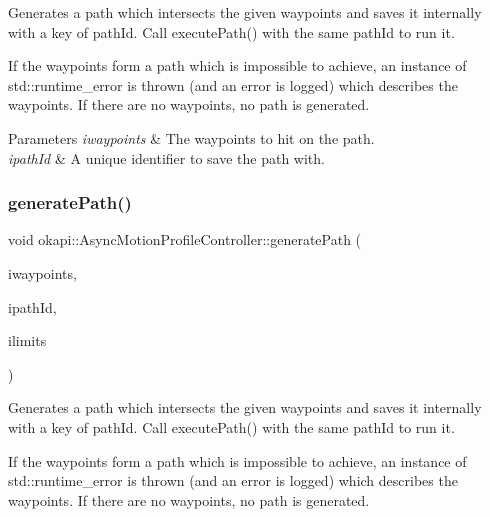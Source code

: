 Generates a path which intersects the given waypoints and saves it internally with a key of path\+Id. Call {\ttfamily execute\+Path()} with the same path\+Id to run it.

If the waypoints form a path which is impossible to achieve, an instance of {\ttfamily std\+::runtime\+\_\+error} is thrown (and an error is logged) which describes the waypoints. If there are no waypoints, no path is generated.


\begin{DoxyParams}{Parameters}
{\em iwaypoints} & The waypoints to hit on the path. \\
\hline
{\em ipath\+Id} & A unique identifier to save the path with. \\
\hline
\end{DoxyParams}
\mbox{\label{classokapi_1_1AsyncMotionProfileController_ada198a8805433f0ed8608577dc83dc5f}} 
\subsubsection{\texorpdfstring{generatePath()}{generatePath()}\hspace{0.1cm}{\footnotesize\ttfamily [2/2]}}
{\footnotesize\ttfamily void okapi\+::\+Async\+Motion\+Profile\+Controller\+::generate\+Path (\begin{DoxyParamCaption}\item[{std\+::initializer\+\_\+list$<$ \mbox{\hyperlink{structokapi_1_1Point}{Point}} $>$}]{iwaypoints,  }\item[{const std\+::string \&}]{ipath\+Id,  }\item[{const \mbox{\hyperlink{structokapi_1_1PathfinderLimits}{Pathfinder\+Limits}} \&}]{ilimits }\end{DoxyParamCaption})}

Generates a path which intersects the given waypoints and saves it internally with a key of path\+Id. Call {\ttfamily execute\+Path()} with the same path\+Id to run it.

If the waypoints form a path which is impossible to achieve, an instance of {\ttfamily std\+::runtime\+\_\+error} is thrown (and an error is logged) which describes the waypoints. If there are no waypoints, no path is generated.


